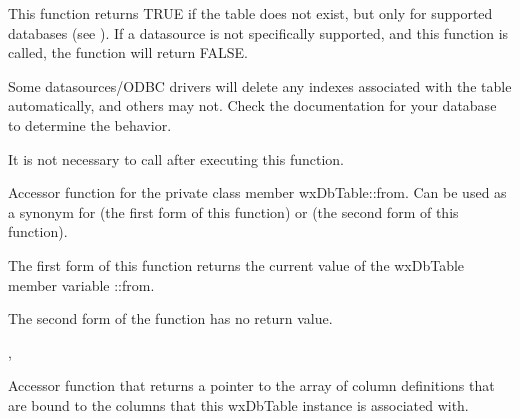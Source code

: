 
This function returns TRUE if the table does not exist, but only for 
supported databases (see ).  If a datasource 
is not specifically supported, and this function is called, the function 
will return FALSE.

Some datasources/ODBC drivers will delete any indexes associated with the 
table automatically, and others may not.  Check the documentation for your 
database to determine the behavior.

It is not necessary to call  
after executing this function.


\label{wxdbtablefrom}


Accessor function for the private class member wxDbTable::from.  Can be used 
as a synonym for  
(the first form of this function) or  
 (the second form 
of this function).




The first form of this function returns the current value of the wxDbTable 
member variable ::from.  

The second form of the function has no return value.


, 


\label{wxdbtablegetcoldefs}


Accessor function that returns a pointer to the array of column definitions 
that are bound to the columns that this wxDbTable instance is associated 
with.

